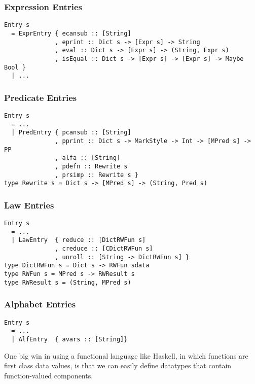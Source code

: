 \subsubsection{Expression Entries}

\begin{verbatim}
Entry s
  = ExprEntry { ecansub :: [String]
              , eprint :: Dict s -> [Expr s] -> String
              , eval :: Dict s -> [Expr s] -> (String, Expr s)
              , isEqual :: Dict s -> [Expr s] -> [Expr s] -> Maybe Bool }
  | ...
\end{verbatim}

\subsubsection{Predicate Entries}

\begin{verbatim}
Entry s
  = ...
  | PredEntry { pcansub :: [String]
              , pprint :: Dict s -> MarkStyle -> Int -> [MPred s] -> PP
              , alfa :: [String]
              , pdefn :: Rewrite s
              , prsimp :: Rewrite s }
type Rewrite s = Dict s -> [MPred s] -> (String, Pred s)
\end{verbatim}


\subsubsection{Law Entries}

\begin{verbatim}
Entry s
  = ...
  | LawEntry  { reduce :: [DictRWFun s]
              , creduce :: [CDictRWFun s]
              , unroll :: [String -> DictRWFun s] }
type DictRWFun s = Dict s -> RWFun sdata
type RWFun s = MPred s -> RWResult s
type RWResult s = (String, MPred s)
\end{verbatim}


\subsubsection{Alphabet Entries}

\begin{verbatim}
Entry s
  = ...
  | AlfEntry  { avars :: [String]}
\end{verbatim}


One big win in using a functional language like Haskell,
in which functions are first class data values,
is that we can easily define datatypes that
contain function-valued components.

